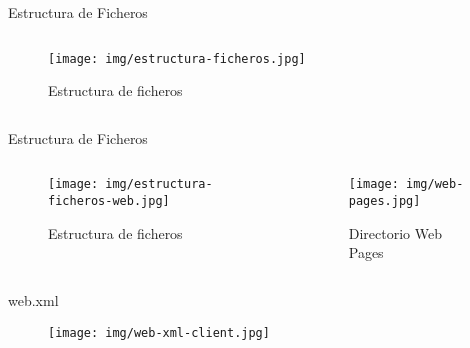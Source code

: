 \documentclass[spanish,xcolor=table,svgnames]{beamer}
\begin{document}
\begin{frame}{Estructura de Ficheros}
  \begin{columns}[onlytextwidth]
    \begin{column}{0.5\textwidth}
      \centering
      \begin{figure}[H]
        \begin{center}
        \texttt{[image: img/estructura-ficheros.jpg]}
        \end{center}
        \caption{Estructura de ficheros}
        \label{fig:estructura-proyecto}
      \end{figure}
    \end{column}
    \begin{column}{0.5\textwidth}
    \end{column}
  \end{columns}
\end{frame}

\begin{frame}{Estructura de Ficheros}
  \begin{columns}[onlytextwidth]
    \begin{column}{0.5\textwidth}
      \centering
      \begin{figure}[H]
        \begin{center}
        \texttt{[image: img/estructura-ficheros-web.jpg]}
        \end{center}
        \caption{Estructura de ficheros}
        \label{fig:estructura-proyecto}
      \end{figure}
    \end{column}
    \begin{column}{0.5\textwidth}
      \centering
      \begin{figure}[H]
        \begin{center}
        \texttt{[image: img/web-pages.jpg]}
        \end{center}
        \caption{Directorio Web Pages}
        \label{fig:estructura-web}
      \end{figure}
    \end{column}
  \end{columns}
\end{frame}


\begin{frame}{web.xml}
  \begin{figure}[H]
    \begin{center}
        \texttt{[image: img/web-xml-client.jpg]}
    \end{center}
    \label{fig:web-xml-client}
  \end{figure}
\end{frame}
\end{document}
